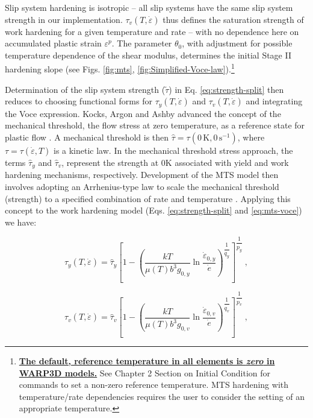 \documentclass[11pt]{report}
\numberwithin{equation}{section}
\newcommand{\ul} {\underline}
\newcommand{\ti}{\emph}
\newcommand{\veps}{\varepsilon}
\begin{document}
\noindent  Slip system hardening is isotropic -- all slip
systems have the same slip system strength in our implementation.
$\tau_{v}\left(T,\dot{\varepsilon}\right)$ thus defines the saturation strength
of work hardening for a given temperature and rate -- with no dependence here on
accumulated plastic strain $\veps^p$. The parameter $\theta_{0}$, with adjustment for
possible temperature dependence of the shear modulus, 
determines the initial Stage II hardening slope (see 
Figs. \ref{fig:mts}, \ref{fig:Simplified-Voce-law}).\footnote{
\ul{\textbf{The default, reference temperature in all elements is \ti{zero} in WARP3D models.}}
See Chapter 2 Section on Initial Condition for commands to set a non-zero
reference temperature. MTS hardening with temperature/rate dependencies
requires the user to consider the setting of an appropriate temperature.}

Determination of the
slip system strength ($\tilde \tau$) in Eq. \ref{eq:strength-split}
then reduces to choosing functional forms
for $\tau_{y}\left(T,\dot{\varepsilon}\right)$ and 
$\tau_{v}\left(T,\dot{\varepsilon}\right)$ and integrating the Voce expression.
Kocks, Argon and Ashby advanced the concept of the mechanical
	threshold, the flow stress at zero temperature, as a reference state for
	plastic flow \cite{KAA75}. 
	A mechanical threshold is then 
	$\hat \tau= \tau \mathrm{( 0\, K, 0\,s^{-1}) }$, 
	where $\tau = \tau \left( \dot\varepsilon,T \right)$ 
	is a kinetic law.
	In the mechanical threshold stress approach, the terms 
	$\hat\tau_{y}$ and $\hat\tau_{v}$, represent the strength 
	at 0K associated with yield and work hardening mechanisms, respectively.
	Development of the MTS model then involves adopting an Arrhenius-type 
	law to scale the mechanical threshold (strength) to a specified 
	combination of rate and temperature \cite{FK88}. 
	Applying this concept to the work hardening model
	(Eqs. \ref{eq:strength-split}
and \ref{eq:mts-voce}) we have:

\begin{equation}
\tau_{y}\left(T,\dot{\varepsilon}\right)=\hat{\tau}_{y}
\left[1-\left(\frac{kT}{\mu\left(T\right)b^{3}g_{0,y}}
\ln\frac{\dot{\varepsilon}_{0,y}}{\dot{e}}\right)^{\dfrac{1}{q_{y}}}\right]^{\dfrac{1}{p_{y}}}\ ,\label{eq:tau-y}
\end{equation}


\begin{equation}
\tau_{v}\left(T,\dot{\varepsilon}\right)=\hat{\tau}_{v}\left[1-\left(\frac{kT}{\mu\left(T\right)b^{3}g_{0,v}}\ln\frac{\dot{\varepsilon}_{0,v}}{\dot{e}}\right)^{\dfrac{1}{q_{v}}}\right]^{\dfrac{1}{p_{v}}}\ ,\label{eq:tau-v}
\end{equation}
\end{document}
